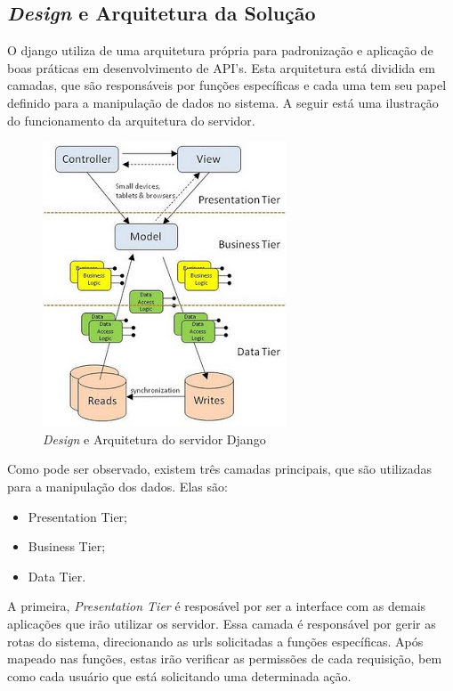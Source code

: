 \subsection{\textit{Design} e Arquitetura da Solução}
\label{sub:design_e_arquitetura_da_soluca_o}

O django utiliza de uma arquitetura própria para padronização e aplicação de boas
práticas em desenvolvimento de API's. Esta arquitetura está dividida em camadas,
que são responsáveis por funções específicas e cada uma tem seu papel definido
para a manipulação de dados no sistema. A seguir está uma ilustração do funcionamento
da arquitetura do servidor. 

\begin{figure}
    \begin{center}
        \includegraphics[scale=1]{figuras/rest_arch.jpg}
    \end{center}
    \caption{\textit{Design} e Arquitetura do servidor Django \cite{serveruml}}
    \label{fig:rest_arch}
\end{figure}

Como pode ser observado, existem três camadas principais, que são utilizadas
para a manipulação dos dados. Elas são:

\begin{itemize}
    \item Presentation Tier;
    \item Business Tier;
    \item Data Tier.
\end{itemize}

A primeira, \textit{Presentation Tier} é resposável por ser a interface com as demais aplicações
que irão utilizar os servidor. Essa camada é responsável por gerir as rotas do sistema, direcionando
as urls solicitadas a funções específicas. Após mapeado nas funções, estas irão verificar as permissões
de cada requisição, bem como cada usuário que está solicitando uma determinada ação.

